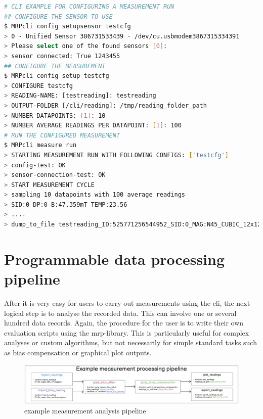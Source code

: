 \begin{lstlisting}[language=bash, caption={CLI example for configuring a measurement run}, label=lst:mrpcli_config_run]
# CLI EXAMPLE FOR CONFIGURING A MEASUREMENT RUN
## CONFIGURE THE SENSOR TO USE
$ MRPcli config setupsensor testcfg
> 0 - Unified Sensor 386731533439 - /dev/cu.usbmodem3867315334391
> Please select one of the found sensors [0]:
> sensor connected: True 1243455
## CONFIGURE THE MEASUREMENT
$ MRPcli config setup testcfg
> CONFIGURE testcfg
> READING-NAME: [testreading]: testreading
> OUTPUT-FOLDER [/cli/reading]: /tmp/reading_folder_path
> NUMBER DATAPOINTS: [1]: 10
> NUMBER AVERAGE READINGS PER DATAPOINT: [1]: 100
# RUN THE CONFIGURED MEASUREMENT
$ MRPcli measure run
> STARTING MEASUREMENT RUN WITH FOLLOWING CONFIGS: ['testcfg']
> config-test: OK
> sensor-connection-test: OK
> START MEASUREMENT CYCLE
> sampling 10 datapoints with 100 average readings
> SID:0 DP:0 B:47.359mT TEMP:23.56
> ....
> dump_to_file testreading_ID:525771256544952_SID:0_MAG:N45_CUBIC_12x12x12.mag.json
\end{lstlisting}

\hypertarget{programmable-data-processing-pipeline}{%
\section{Programmable data processing
pipeline}\label{programmable-data-processing-pipeline}}

After it is very easy for users to carry out measurements using the
\gls{cli}, the next logical step is to analyse the recorded data. This
can involve one or several hundred data records. Again, the procedure
for the user is to write their own evaluation scripts using the
\gls{mrp}-library. This is particularly useful for complex analyses or
custom algorithms, but not necessarily for simple standard tasks such as
bias compensation or graphical plot outputs.

\begin{figure}
\centering
\includegraphics{./generated_images/border_example_measurement_analysis_pipeline.png}
\caption{example measurement analysis pipeline
\label{example_measurement_analysis_pipeline.png}}
\end{figure}

